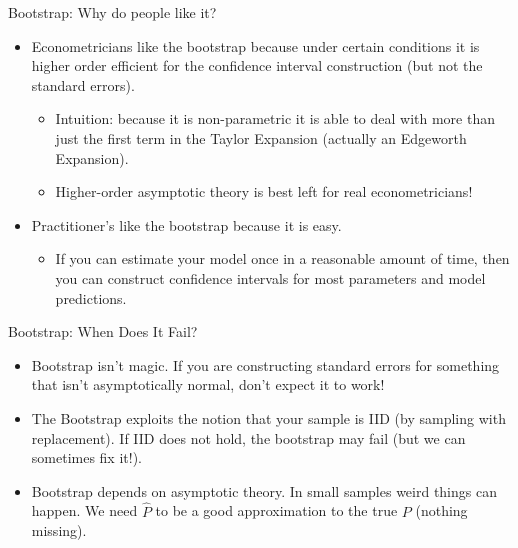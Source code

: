 \documentclass[aspectratio=169]{beamer}
\begin{document}
\begin{frame}{Bootstrap: Why do people like it?}
\begin{itemize}
\item Econometricians like the bootstrap because under certain conditions it is \alert{higher order efficient} for the confidence interval construction (but not the standard errors).
\begin{itemize}
\item Intuition: because it is non-parametric it is able to deal with more than just the first term in the Taylor Expansion (actually an \alert{Edgeworth Expansion}).
\item Higher-order asymptotic theory is best left for real econometricians!
\end{itemize}
\item Practitioner's like the bootstrap because it is easy.
\begin{itemize}
\item If you can estimate your model once in a reasonable amount of time, then you can construct confidence intervals for most parameters and model predictions.
\end{itemize}
\end{itemize}
\end{frame}

\begin{frame}{Bootstrap: When Does It Fail?}
\begin{itemize}
\item Bootstrap isn't magic. If you are constructing standard errors for something that isn't asymptotically normal, don't expect it to work!
\item The Bootstrap exploits the notion that your sample is IID (by sampling with replacement). If IID does not hold, the bootstrap may fail (but we can sometimes fix it!).
\item Bootstrap depends on asymptotic theory. In small samples weird things can happen. We need $\hat{P}$ to be a good approximation to the true $P$ (nothing missing).
\end{itemize}
\end{frame}
\end{document}
